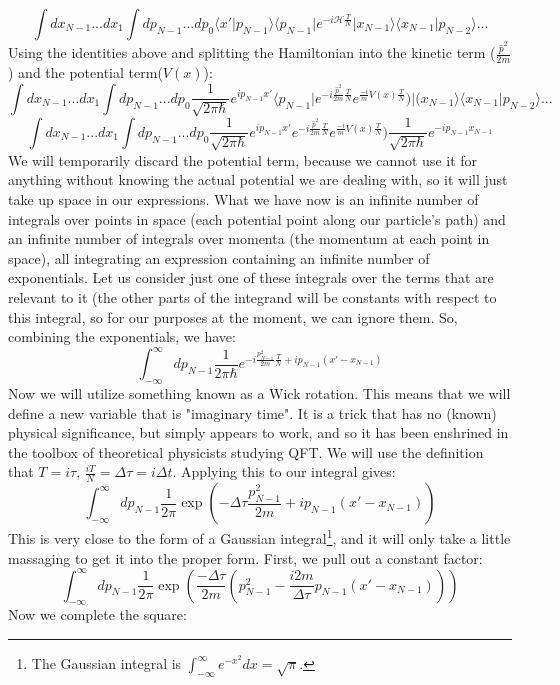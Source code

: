 \documentclass{report}
\begin{document}
\[
\int dx_{N-1}... dx_1 \int dp_{N-1}...dp_0 \langle x' \vert p_{N-1} \rangle \langle p_{N-1} \vert e^{-i\mathcal{H}\frac{T}{N}} \vert x_{N-1} \rangle \langle x_{N-1} \vert p_{N-2} \rangle ...
\]
Using the identities above and splitting the Hamiltonian into the kinetic term ($\frac{\hat{p}^2}{2m}$) and the potential term($V(x)$):
\[
\int dx_{N-1}... dx_1 \int dp_{N-1}...dp_0
\frac{1}{\sqrt{2\pi\hbar}}e^{ip_{N-1}x'} \langle p_{N-1} \vert
e^{-i\frac{\hat{p}^2}{2m}\frac{T}{N}}e^{\frac{-i}{m}V(x)\frac{T}{N}})
\vert(x_{N-1} \rangle \langle x_{N-1} \vert p_{N-2} \rangle ...
\]
\[
\int dx_{N-1}... dx_1 \int dp_{N-1}...dp_0
\frac{1}{\sqrt{2\pi\hbar}} e^{ip_{N-1}x'}
e^{-i\frac{\hat{p}^2}{2m}\frac{T}{N}}e^{\frac{-i}{m}V(x)\frac{T}{N}})
\frac{1}{\sqrt{2\pi\hbar}} e^{-i p_{N-1}x_{N-1}}
\]
We will temporarily discard the potential term, because we cannot use it for anything without knowing the actual potential we are dealing with, so it will just take up space in our expressions. What we have now is an infinite number of integrals over points in space (each potential point along our particle's path) and an infinite number of integrals over momenta (the momentum at each point in space), all integrating an expression containing an infinite number of exponentials. Let us consider just one of these integrals over the terms that are relevant to it (the other parts of the integrand will be constants with respect to this integral, so for our purposes at the moment, we can ignore them. So, combining the exponentials, we have:
\[
\int_{- \infty}^{\infty} dp_{N-1} \frac{1}{2\pi\hbar}
e^{-i \frac{p_{N-1}^2}{2m}\frac{T}{N}
+ ip_{N-1}(x' - x_{N-1})}
\]
Now we will utilize something known as a Wick rotation. This means that we will define a new variable that is "imaginary time". It is a trick that has no (known) physical significance, but simply appears to work, and so it has been enshrined in the toolbox of theoretical physicists studying QFT. We will use the definition that $T = i\tau$, $\frac{iT}{N} = \Delta \tau = i \Delta t$. Applying this to our integral gives:
\[
\int_{-\infty}^{\infty} dp_{N-1} \frac{1}{2\pi}
\exp{(-\Delta \tau \frac{p_{N-1}^2}{2m}
+ i p_{N-1} (x' - x_{N-1}))}
\]
This is very close to the form of a Gaussian integral\footnote{The Gaussian integral is $\int_{-\infty}^{\infty} e^{-x^2}dx = \sqrt{\pi}$.}, and it will only take a little massaging to get it into the proper form. First, we pull out a constant factor:
\[
\int_{-\infty}^{\infty} dp_{N-1} \frac{1}{2\pi}
\exp{(\frac{-\Delta \tau}{2m}(p_{N-1}^2
- \frac{i2m}{\Delta \tau} p_{N-1} (x' - x_{N-1})))}
\]
Now we complete the square:
\end{document}
